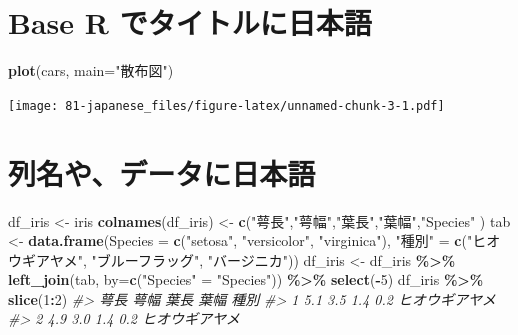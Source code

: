 \documentclass[
  xelatex, ja=standard]{bxjsbook}
\newenvironment{Shaded}{\begin{snugshade}}{\end{snugshade}}
\newcommand{\AttributeTok}[1]{\textcolor[rgb]{0.13,0.29,0.53}{#1}}
\newcommand{\CommentTok}[1]{\textcolor[rgb]{0.56,0.35,0.01}{\textit{#1}}}
\newcommand{\DecValTok}[1]{\textcolor[rgb]{0.00,0.00,0.81}{#1}}
\newcommand{\FunctionTok}[1]{\textcolor[rgb]{0.13,0.29,0.53}{\textbf{#1}}}
\newcommand{\NormalTok}[1]{#1}
\newcommand{\OtherTok}[1]{\textcolor[rgb]{0.56,0.35,0.01}{#1}}
\newcommand{\SpecialCharTok}[1]{\textcolor[rgb]{0.81,0.36,0.00}{\textbf{#1}}}
\newcommand{\StringTok}[1]{\textcolor[rgb]{0.31,0.60,0.02}{#1}}
\theoremstyle{definition}
\theoremstyle{definition}
\theoremstyle{definition}
\theoremstyle{definition}
\theoremstyle{remark}
\begin{document}
\hypertarget{base-r-ux3067ux30bfux30a4ux30c8ux30ebux306bux65e5ux672cux8a9e}{%
\section{Base R でタイトルに日本語}\label{base-r-ux3067ux30bfux30a4ux30c8ux30ebux306bux65e5ux672cux8a9e}}

\begin{Shaded}
\begin{Highlighting}[]
\FunctionTok{plot}\NormalTok{(cars, }\AttributeTok{main=}\StringTok{"散布図"}\NormalTok{)}
\end{Highlighting}
\end{Shaded}

\texttt{[image: 81-japanese\_files/figure-latex/unnamed-chunk-3-1.pdf]}

\hypertarget{ux5217ux540dux3084ux30c7ux30fcux30bfux306bux65e5ux672cux8a9e}{%
\section{列名や、データに日本語}\label{ux5217ux540dux3084ux30c7ux30fcux30bfux306bux65e5ux672cux8a9e}}

\begin{Shaded}
\begin{Highlighting}[]
\NormalTok{df\_iris }\OtherTok{\textless{}{-}}\NormalTok{ iris}
\FunctionTok{colnames}\NormalTok{(df\_iris) }\OtherTok{\textless{}{-}} \FunctionTok{c}\NormalTok{(}\StringTok{"萼長"}\NormalTok{,}\StringTok{"萼幅"}\NormalTok{,}\StringTok{"葉長"}\NormalTok{,}\StringTok{"葉幅"}\NormalTok{,}\StringTok{"Species"}\NormalTok{ )}
\NormalTok{tab }\OtherTok{\textless{}{-}} \FunctionTok{data.frame}\NormalTok{(}\AttributeTok{Species =} \FunctionTok{c}\NormalTok{(}\StringTok{"setosa"}\NormalTok{, }\StringTok{"versicolor"}\NormalTok{, }\StringTok{"virginica"}\NormalTok{), }
                  \StringTok{"種別"} \OtherTok{=} \FunctionTok{c}\NormalTok{(}\StringTok{"ヒオウギアヤメ"}\NormalTok{, }\StringTok{"ブルーフラッグ"}\NormalTok{, }\StringTok{"バージニカ"}\NormalTok{))}
\NormalTok{df\_iris }\OtherTok{\textless{}{-}}\NormalTok{ df\_iris }\SpecialCharTok{\%\textgreater{}\%} \FunctionTok{left\_join}\NormalTok{(tab, }\AttributeTok{by=}\FunctionTok{c}\NormalTok{(}\StringTok{"Species"} \OtherTok{=} \StringTok{"Species"}\NormalTok{)) }\SpecialCharTok{\%\textgreater{}\%} \FunctionTok{select}\NormalTok{(}\SpecialCharTok{{-}}\DecValTok{5}\NormalTok{)}
\NormalTok{df\_iris }\SpecialCharTok{\%\textgreater{}\%} \FunctionTok{slice}\NormalTok{(}\DecValTok{1}\SpecialCharTok{:}\DecValTok{2}\NormalTok{)}
\CommentTok{\#\textgreater{}   萼長 萼幅 葉長 葉幅           種別}
\CommentTok{\#\textgreater{} 1  5.1  3.5  1.4  0.2 ヒオウギアヤメ}
\CommentTok{\#\textgreater{} 2  4.9  3.0  1.4  0.2 ヒオウギアヤメ}
\end{Highlighting}
\end{Shaded}
\end{document}
